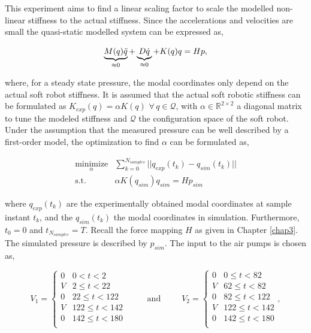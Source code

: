 This experiment aims to find a linear scaling factor to scale the modelled non-linear stiffness to the actual stiffness. Since the accelerations and velocities are small the quasi-static modelled system can be expressed as,

\begin{equation}
   \underbrace{M(q) \Ddot{q}}_{\approx 0} + \underbrace{D \dot{q}}_{\approx 0} + K(q) q = Hp,
\end{equation}

where, for a steady state pressure, the modal coordinates only depend on the actual soft robot stiffness. It is assumed that the actual soft robotic stiffness can be formulated as $K_{exp}(q) = \alpha K(q) \hspace{4pt} \forall \hspace{2pt} q \in \mathcal{Q}$, with $\alpha \in \mathbb{R}^{2\times 2}$ a diagonal matrix to tune the modeled stiffness and $\mathcal{Q}$ the configuration space of the soft robot. Under the assumption that the measured pressure can be well described by a first-order model, the optimization to find $\alpha$ can be formulated as, 


\begin{equation}
\begin{split}
    \underset{\alpha}{\text{minimize}}& \sum_{k=0}^{N_{samples}} || q_{exp}(t_k) - q_{sim}(t_k)||  \\
    \text{s.t.} \hspace{10pt} & \alpha K(q_{sim}) q_{sim} = Hp_{sim}
    \end{split}
    \label{eq5:optalpha}
\end{equation}

where $q_{exp}(t_k)$ are the experimentally obtained modal coordinates at sample instant $t_k$, and the $q_{sim}(t_k)$ the modal coordinates in simulation. Furthermore, $t_0 = 0$ and $t_{N_{samples}} = T$. Recall the force mapping $H$ as given in Chapter \ref{chap3}. The simulated pressure is described by $p_{sim}$. The input to the air pumps is chosen as,

\begin{equation}
    V_1 =
\begin{cases}
0 & 0 < t < 2\\
V & 2 \leq t < 22\\
0 & 22 \leq t < 122\\
V & 122 \leq t < 142\\
0 & 142 \leq t < 180\\
\end{cases} \hspace{30pt} \text{and} \hspace{30pt}      V_2 =
\begin{cases}
0 & 0 \leq t < 82\\
V & 62 \leq t < 82\\
0 & 82 \leq t < 122\\
V & 122 \leq t < 142\\
0 & 142 \leq t < 180\\
\end{cases} ,
\end{equation}

